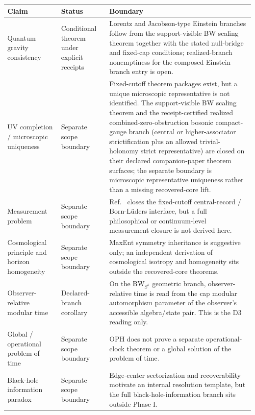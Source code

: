 \begin{center}
\scriptsize
\setlength{\tabcolsep}{3pt}
\begin{tabular}{@{}>{\raggedright\arraybackslash}p{}>{\raggedright\arraybackslash}p{}>{\raggedright\arraybackslash}p{}@{}}
\toprule
Claim & Status & Boundary \\
\midrule
Quantum gravity consistency & Conditional theorem under explicit receipts & Lorentz and Jacobson-type Einstein branches follow from the support-visible BW scaling theorem together with the stated null-bridge and fixed-cap conditions; realized-branch nonemptiness for the composed Einstein branch entry is open. \\
UV completion / microscopic uniqueness & Separate scope boundary & Fixed-cutoff theorem packages exist, but a unique microscopic representative is not identified. The support-visible BW scaling theorem and the receipt-certified realized combined-zero-obstruction bosonic compact-gauge branch (central or higher-associator strictification plus an allowed trivial-holonomy strict representative) are closed on their declared companion-paper theorem surfaces; the separate boundary is microscopic representative uniqueness rather than a missing recovered-core lift. \\
Measurement problem & Separate scope boundary & Ref.~\cite{ophmicrophysics} closes the fixed-cutoff central-record / Born-L\"uders interface, but a full philosophical or continuum-level measurement closure is not derived here. \\
Cosmological principle and horizon homogeneity & Separate scope boundary & MaxEnt symmetry inheritance is suggestive only; an independent derivation of cosmological isotropy and homogeneity sits outside the recovered-core theorems. \\
Observer-relative modular time & Declared-branch corollary & On the BW\(_{S^2}\) geometric branch, observer-relative time is read from the cap modular automorphism parameter of the observer's accessible algebra/state pair. This is the D3 reading only. \\
Global / operational problem of time & Separate scope boundary & OPH does not prove a separate operational-clock theorem or a global solution of the problem of time. \\
Black-hole information paradox & Separate scope boundary & Edge-center sectorization and recoverability motivate an internal resolution template, but the full black-hole-information branch sits outside Phase I. \\

\end{tabular}
\end{center}
